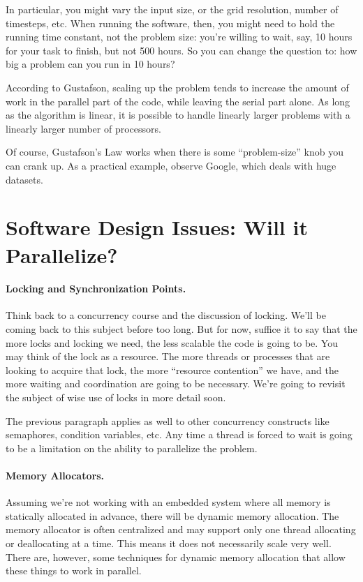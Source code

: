 In particular, you might vary the input size, or the grid resolution,
number of timesteps, etc. When running the software, then, you might
need to hold the running time constant, not the problem size: you're
willing to wait, say, 10 hours for your task to finish, but not 500
hours. So you can change the question to: how big a problem can you
run in 10 hours?

According to Gustafson, scaling up the problem tends to increase the
amount of work in the parallel part of the code, while leaving the
serial part alone. As long as the algorithm is linear, it is possible
to handle linearly larger problems with a linearly larger number of
processors.

Of course, Gustafson's Law works when there is some ``problem-size''
knob you can crank up. As a practical example, observe Google, which
deals with huge datasets.


\section*{Software Design Issues: Will it Parallelize?}


\paragraph{Locking and Synchronization Points.}
Think back to a concurrency course and the discussion of locking. We'll be coming back to this subject before too long. But for now, suffice it to say that the more locks and locking we need, the less scalable the code is going to be. You may think of the lock as a resource. The more threads or processes that are looking to acquire that lock, the more ``resource contention'' we have, and the more waiting and coordination are going to be necessary. We're going to revisit the subject of wise use of locks in more detail soon.

The previous paragraph applies as well to other concurrency constructs like semaphores, condition variables, etc. Any time a thread is forced to wait is going to be a limitation on the ability to parallelize the problem.

\paragraph{Memory Allocators.}
Assuming we're not working with an embedded system where all memory is statically allocated in advance, there will be dynamic memory allocation. The memory allocator is often centralized and may support only one thread allocating or deallocating at a time. This means it does not necessarily scale very well. There are, however, some techniques for dynamic memory allocation that allow these things to work in parallel.

